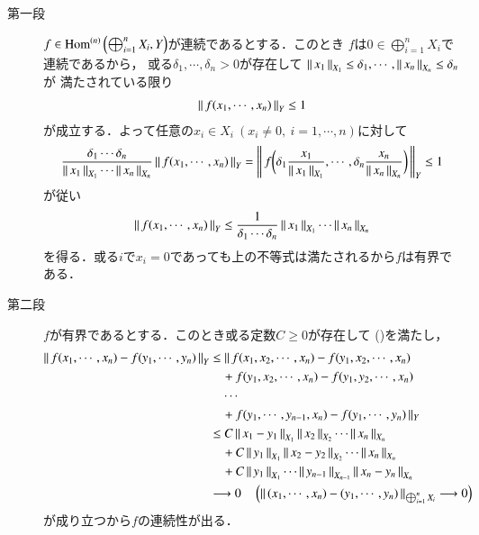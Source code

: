 	\begin{prf}\mbox{}
		\begin{description}
			\item[第一段]
				$f \in \Ln{\bigoplus_{i=1}^n X_i}{Y}{n}$が連続であるとする．このとき
				$f$は$0 \in \bigoplus_{i=1}^n X_i$で連続であるから，
				或る$\delta_1,\cdots,\delta_n > 0$が存在して
				$\Norm{x_1}{X_1} \leq \delta_1,\cdots,\Norm{x_n}{X_n} \leq \delta_n$が
				満たされている限り
				\begin{align}
					\Norm{f(x_1,\cdots,x_n)}{Y} \leq 1
				\end{align}
				が成立する．よって任意の$x_i \in X_i\ (x_i \neq 0,\ i=1,\cdots,n)$に対して
				\begin{align}
					\frac{\delta_1 \cdots \delta_n}{\Norm{x_1}{X_1} \cdots \Norm{x_n}{X_n}}
					\Norm{f(x_1,\cdots,x_n)}{Y}
					= \Norm{f\biggl(\delta_1 \frac{x_1}{\Norm{x_1}{X_1}}, \cdots, \delta_n \frac{x_n}{\Norm{x_n}{X_n}} \biggr)}{Y}
					\leq 1
				\end{align}
				が従い
				\begin{align}
					\Norm{f(x_1,\cdots,x_n)}{Y} \leq \frac{1}{\delta_1 \cdots \delta_n} \Norm{x_1}{X_1} \cdots \Norm{x_n}{X_n}
				\end{align}
				を得る．或る$i$で$x_i = 0$であっても上の不等式は満たされるから$f$は有界である．
			
			\item[第二段]
				$f$が有界であるとする．このとき或る定数$C \geq 0$が存在して
				()を満たし，
				\begin{align}
					\Norm{f(x_1,\cdots,x_n) - f(y_1,\cdots,y_n)}{Y}
						&\leq \|\, f(x_1,x_2,\cdots,x_n) - f(y_1,x_2,\cdots,x_n) \\
						&\quad + f(y_1,x_2,\cdots,x_n) - f(y_1,y_2,\cdots,x_n) \\
						&\quad \cdots \\
						&\quad + f(y_1,\cdots,y_{n-1},x_n) - f(y_1,\cdots,y_n)\, \|_Y \\
					&\leq C \Norm{x_1 - y_1}{X_1} \Norm{x_2}{X_2} \cdots \Norm{x_n}{X_n} \\
						&\quad + C \Norm{y_1}{X_1} \Norm{x_2 - y_2}{X_2} \cdots \Norm{x_n}{X_n} \\
						&\quad + C \Norm{y_1}{X_1} \cdots \Norm{y_{n-1}}{X_{n-1}} \Norm{x_n - y_n}{X_n} \\
					&\longrightarrow 0
					\quad \left( \Norm{(x_1,\cdots,x_n) - (y_1,\cdots,y_n)}{\bigoplus_{i=1}^n X_i} \longrightarrow 0 \right)
				\end{align}
				が成り立つから$f$の連続性が出る．
				\QED
		\end{description}
	\end{prf}
	
